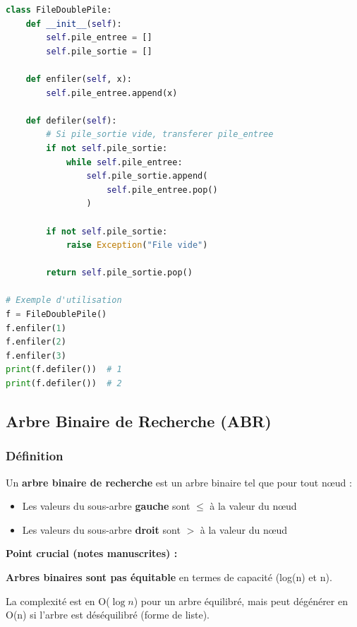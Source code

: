 \documentclass[12pt,a4paper]{article}
\begin{document}
\begin{exemple}
\begin{lstlisting}[language=Python]
class FileDoublePile:
    def __init__(self):
        self.pile_entree = []
        self.pile_sortie = []
    
    def enfiler(self, x):
        self.pile_entree.append(x)
    
    def defiler(self):
        # Si pile_sortie vide, transferer pile_entree
        if not self.pile_sortie:
            while self.pile_entree:
                self.pile_sortie.append(
                    self.pile_entree.pop()
                )
        
        if not self.pile_sortie:
            raise Exception("File vide")
        
        return self.pile_sortie.pop()

# Exemple d'utilisation
f = FileDoublePile()
f.enfiler(1)
f.enfiler(2)
f.enfiler(3)
print(f.defiler())  # 1
print(f.defiler())  # 2
\end{lstlisting}
\end{exemple}

\newpage
\subsection{Arbre Binaire de Recherche (ABR)}

\subsubsection{Définition}

\begin{definition}
Un \textbf{arbre binaire de recherche} est un arbre binaire tel que pour tout nœud :
\begin{itemize}
    \item Les valeurs du sous-arbre \textcolor{defvert}{\textbf{gauche}} sont $\leq$ à la valeur du nœud
    \item Les valeurs du sous-arbre \textcolor{importantrouge}{\textbf{droit}} sont $>$ à la valeur du nœud
\end{itemize}
\end{definition}

\begin{notecours}
\textbf{Point crucial (notes manuscrites) :}

\textbf{Arbres binaires sont pas équitable} en termes de capacité (log(n) et n).

La complexité est en O($\log n$) pour un arbre équilibré, mais peut dégénérer en O(n) si l'arbre est déséquilibré (forme de liste).
\end{notecours}
\end{document}
